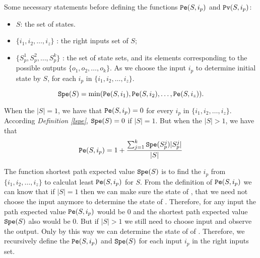 Some necessary statements before defining the functions $\Pe(S, i_p)$ and ${\tt Pv}(S, i_p)$:
\begin{itemize}
  \item $S$: the set of states.
  \item $\{i_1,i_2,\ldots, i_z\}$ : the right inputs set of $S$;
  \item $\{S_p^1,S_p^2,\ldots, S_p^k\}$ : the set of state sets, and its elements corresponding to the possible outputs $\{o_1,o_2,\ldots,o_k\}$. As we choose the input $i_p$ to determine initial state by $S$, for each $i_p$ in $\{i_1,i_2,\ldots, i_z\}$.
\end{itemize} 
\begin{definition}[$\Spe(S)$] \label{lspe}
 \[{\tt Spe}(S)= \min({\tt Pe}(S, i_1),{\tt Pe}(S, i_2),\ldots,{\tt Pe}(S, i_z)).\] 
\end{definition}

\begin{definition}[$\Pe(S, i_p)$] 
When the $|S|=1$, we have that
${\tt Pe}(S, i_p)=0$  for every $i_p$ in $\{i_1,i_2,\ldots, i_z\}$. According {\em Definition \ref{lspe}}, ${\tt Spe}(S)=0$ if $|S|=1$. But when the $|S|>1$, 
we have that  
\[{\tt Pe}(S, i_p)=1 +\frac{\sum_{j=1}^k {\tt Spe}(S_p^j)|S_p^j|}{ |S|}\] 
\end{definition}

The function shortest path  expected value $\Spe(S)$ is to find the $i_p$ from $\{i_1,i_2,\ldots, i_z\}$ to calculat least $\Pe(S, i_p)$ for $S$. From the definition of $\Pe(S, i_p)$ we can know that if $|S|=1$ then we can make sure the state of \BCNs, that we need not choose the input anymore to determine the state of \BCNs. Therefore, for any input the path expected value $\Pe(S, i_p)$ would be $0$ and the shortest path expected value $\Spe(S)$ also would be $0$. But if $|S|>1$ we still need to choose input and observe the output. Only by this way we can determine the state of of \BCNs. Therefore, we recursively define the $\Pe(S, i_p)$ and $\Spe(S)$ for each input $i_p$ in the right inputs set. 

